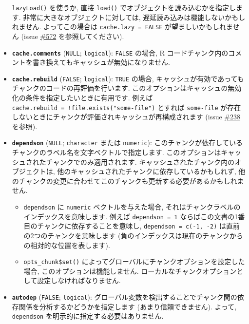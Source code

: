 \documentclass[
  lualatex,ja=standard,jafont=noto-otf]{bxjsreport}
\providecommand{\tightlist}{%
  \setlength{\itemsep}{0pt}\setlength{\parskip}{0pt}}
\begin{document}
\begin{itemize}
  \texttt{lazyLoad()} を使うか, 直接 \texttt{load()}
  でオブジェクトを読み込むかを指定します.
  非常に大きなオブジェクトに対しては,
  遅延読み込みは機能しないかもしれません. よってこの場合は
  \texttt{cache.lazy\ =\ FALSE} が望ましいかもしれません (issue
  \href{https://github.com/yihui/knitr/issues/572}{\#572}
  を参照してください).
\item
  \textbf{\texttt{cache.comments}} (\texttt{NULL}; \texttt{logical}):
  \texttt{FALSE} の場合, R
  コードチャンク内のコメントを書き換えてもキャッシュが無効になりません.
\item
  \textbf{\texttt{cache.rebuild}} (\texttt{FALSE}; \texttt{logical}):
  \texttt{TRUE} の場合,
  キャッシュが有効であってもチャンクのコードの再評価を行います.
  このオプションはキャッシュの無効化の条件を指定したいときに有用です.
  例えば \texttt{cache.rebuild\ =\ !file.exists("some-file")} とすれば
  \texttt{some-file}
  が存在しないときにチャンクが評価されキャッシュが再構成されます (issue
  \href{https://github.com/yihui/knitr/issues/238}{\#238} を参照).
\item
  \textbf{\texttt{dependson}} (\texttt{NULL}; \texttt{character} または
  \texttt{numeric}):
  このチャンクが依存しているチャンクのラベル名を文字ベクトルで指定します.
  このオプションはキャッシュされたチャンクでのみ適用されます.
  キャッシュされたチャンク内のオブジェクトは,
  他のキャッシュされたチャンクに依存しているかもしれず,
  他のチャンクの変更に合わせてこのチャンクも更新する必要があるかもしれません.

  \begin{itemize}
  \tightlist
  \item
    \texttt{dependson} に \texttt{numeric} ベクトルを与えた場合,
    それはチャンクラベルのインデックスを意味します. 例えば
    \texttt{dependson\ =\ 1}
    ならばこの文書の1番目のチャンクに依存することを意味し,
    \texttt{dependson\ =\ c(-1,\ -2)} は直前の2つのチャンクを意味します
    (負のインデックスは現在のチャンクからの相対的な位置を表します).
  \item
    \texttt{opts\_chunk\$set()}
    によってグローバルにチャンクオプションを設定した場合,
    このオプションは機能しません.
    ローカルなチャンクオプションとして設定しなければなりません.
  \end{itemize}
\item
  \textbf{\texttt{autodep}} (\texttt{FALSE}; \texttt{logical}):
  グローバル変数を検出することでチャンク間の依存関係を分析するかどうかを指定します
  (あまり信頼できません). よって, \texttt{dependson}
  を明示的に指定する必要はありません.
\end{itemize}
\end{document}
